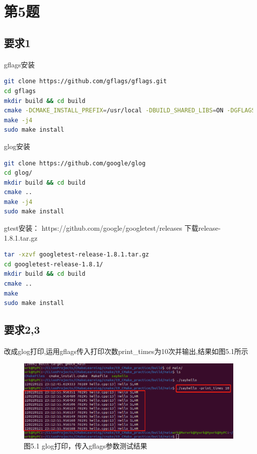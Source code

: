 \documentclass[40pt,a4paper，UTF8]{ctexart}
\begin{document}
\section{第5题}
\subsection{要求1} 
\paragraph{}

gflags安装
\begin{lstlisting}[language=bash, caption=gflags安装]
git clone https://github.com/gflags/gflags.git
cd gflags
mkdir build && cd build
cmake -DCMAKE_INSTALL_PREFIX=/usr/local -DBUILD_SHARED_LIBS=ON -DGFLAGS_NAMESPACE=gflags ../
make -j4
sudo make install
\end{lstlisting}

glog安装
\begin{lstlisting}[language=bash, caption=glog安装]
git clone https://github.com/google/glog
cd glog/
mkdir build && cd build
cmake ..
make -j4
sudo make install
\end{lstlisting}

gtest安装：
https://github.com/google/googletest/releases 下载release-1.8.1.tar.gz 
\begin{lstlisting}[language=bash, caption=gtest安装]
tar -xzvf googletest-release-1.8.1.tar.gz
cd googletest-release-1.8.1/
mkdir build && cd build
cmake ..
make
sudo make install
\end{lstlisting}
\paragraph{}

\subsection{要求2,3} 
\paragraph{}

改成glog打印,运用gflags传入打印次数print\_times为10次并输出,结果如图5.1所示

\begin{figure}[H]
\centering
\includegraphics[width=4.8in]{ch1_5_1.png} {图5.1 glog打印，传入gflags参数测试结果}
\end{figure}
\end{document}
